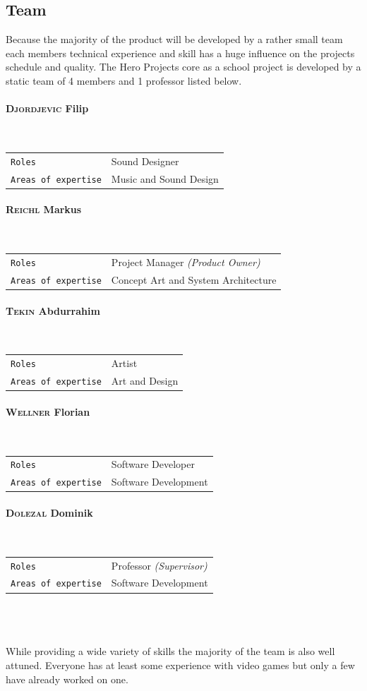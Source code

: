 \documentclass[11pt]{article}
\begin{document}
\subsection{Team}
Because the majority of the product will be developed by a rather small team each members technical experience and skill has a huge influence on the projects schedule and quality.
The Hero Projects core as a school project is developed by a static team of 4 members and 1 professor listed below.
\paragraph{\textsc{Djordjevic} Filip} ~\\
\begin{tabular}{ll}
\texttt{Roles} & Sound Designer\\
\texttt{Areas of expertise} & Music and Sound Design
\end{tabular}
\paragraph{\textsc{Reichl} Markus} ~\\
\begin{tabular}{ll}
\texttt{Roles} & Project Manager \textit{\small{(Product Owner)}}\\
\texttt{Areas of expertise} & Concept Art and System Architecture
\end{tabular}
\paragraph{\textsc{Tekin} Abdurrahim} ~\\
\begin{tabular}{ll}
\texttt{Roles} & Artist\\
\texttt{Areas of expertise} & Art and Design
\end{tabular}
\paragraph{\textsc{Wellner} Florian} ~\\
\begin{tabular}{ll}
\texttt{Roles} & Software Developer\\
\texttt{Areas of expertise} & Software Development
\end{tabular}
\paragraph{\textsc{Dolezal} Dominik} ~\\
\begin{tabular}{ll}
\texttt{Roles} & Professor \textit{\small{(Supervisor)}}\\
\texttt{Areas of expertise} & Software Development
\end{tabular}
\\
\\
\\
While providing a wide variety of skills the majority of the team is also well attuned. Everyone has at least some experience with video games but only a few have already worked on one.
\end{document}
